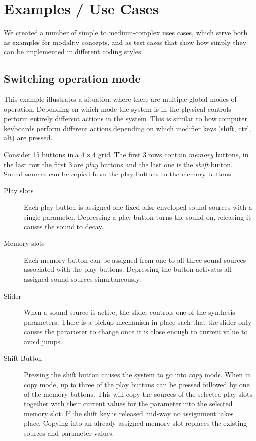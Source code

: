 \documentclass{article}
\begin{document}
\section{Examples / Use Cases}
\label{sec:examples_use_cases}

We created a number of simple to medium-complex uses cases, which serve both as examples for modality concepts, and as test cases that show how simply they can be implemented in different coding styles. 

\subsection{Switching operation mode}
\label{sub:mpd_18}

This example illustrates a situation where there are multiple global  modes of operation. Depending on which mode the system is in the physical controls perform entirely different actions in the system. This is similar to how computer keyboards perform different actions depending on which modifier keys (shift, ctrl, alt) are pressed.

Consider 16 buttons in a $4\times4$ grid. The first 3 rows contain \emph{memory} buttons, in the last row the first 3 are \emph{play} buttons and the last one is the \emph{shift} button.   Sound sources can be copied from the play buttons to the memory buttons.

\begin{description}
 \item [Play slots]  Each play button is assigned one fixed adsr enveloped sound sources with a single parameter. Depressing a play button turns the sound on, releasing it causes the sound to decay. 
 \item [Memory slots] Each memory button can be assigned from one to all three sound sources associated with the play buttons. Depressing the button activates all assigned sound sources simultaneously.
 \item [Slider] When a sound source is active, the slider controls one of the synthesis parameters. There is a pickup mechanism in place such that the slider only causes the parameter to change once it is close enough to current value to avoid jumps. 
 \item [Shift Button] Pressing the shift button causes the system to go into \emph{copy} mode. When in copy mode, up to three of the play buttons can be pressed followed by one of the memory buttons. This will copy the sources of the selected play slots together with their current values for the parameter into the selected memory slot. If the shift key is released mid-way no assignment takes place. Copying into an already assigned memory slot replaces the existing sources and parameter values.
\end{description}
\end{document}
